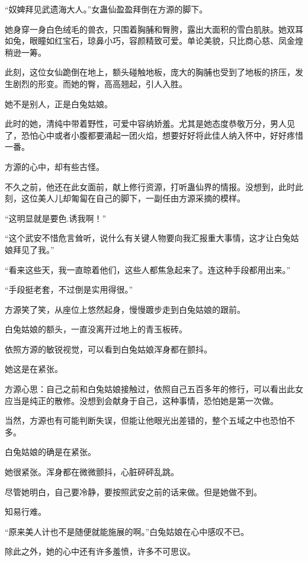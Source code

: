 
\begin{this_body}

“奴婢拜见武遗海大人。”女蛊仙盈盈拜倒在方源的脚下。

她身穿一身白色绒毛的兽衣，只围着胸脯和臀胯，露出大面积的雪白肌肤。她双耳如兔，眼瞳如红宝石，琼鼻小巧，容颜精致可爱。单论美貌，只比商心慈、凤金煌稍逊一筹。

此刻，这位女仙跪倒在地上，额头碰触地板，庞大的胸脯也受到了地板的挤压，发生剧烈的形变。而她的臀，高高翘起，引人入胜。

她不是别人，正是白兔姑娘。

此时的她，清纯中带着野性，可爱中容纳娇羞。尤其是她态度恭敬万分，男人见了，恐怕心中或者小腹都要涌起一团火焰，想要好好将此佳人纳入怀中，好好疼惜一番。

方源的心中，却有些古怪。

不久之前，他还在此女面前，献上修行资源，打听蛊仙界的情报。没想到，此时此刻，这位美人儿却匍匐在自己的脚下，一副任由方源采摘的模样。

“这明显就是要色.诱我啊！”

“这个武安不惜危言耸听，说什么有关键人物要向我汇报重大事情，这才让白兔姑娘拜见了我。”

“看来这些天，我一直晾着他们，这些人都焦急起来了。连这种手段都用出来。”

“手段挺老套，不过倒是实用得很。”

方源笑了笑，从座位上悠然起身，慢慢踱步走到白兔姑娘的跟前。

白兔姑娘的额头，一直没离开过地上的青玉板砖。

依照方源的敏锐视觉，可以看到白兔姑娘浑身都在颤抖。

她这是在紧张。

方源心思：自己之前和白兔姑娘接触过，依照自己五百多年的修行，可以看出此女应当是纯正的散修。没想到会献身于自己，这种事情，恐怕她是第一次做。

当然，方源也有可能判断失误，但能让他眼光出差错的，整个五域之中也恐怕不多。

白兔姑娘的确是在紧张。

她很紧张。浑身都在微微颤抖，心脏砰砰乱跳。

尽管她明白，自己要冷静，要按照武安之前的话来做。但是她做不到。

知易行难。

“原来美人计也不是随便就能施展的啊。”白兔姑娘在心中感叹不已。

除此之外，她的心中还有许多羞愤，许多不可思议。


\end{this_body}
